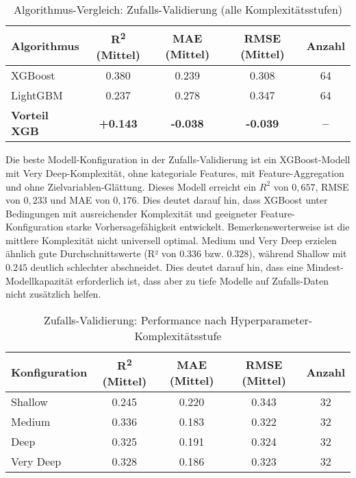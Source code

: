 \begin{table}[H]
  \centering
  \begin{tabular}{lcccc}
    \toprule
    \textbf{Algorithmus} & \textbf{R\textsuperscript{2} (Mittel)} & \textbf{MAE (Mittel)}  & \textbf{RMSE (Mittel)} & \textbf{Anzahl} \\
    \midrule
    XGBoost & 0.380 & 0.239 & 0.308 & 64 \\
    LightGBM & 0.237 & 0.278 & 0.347 & 64 \\
    \midrule
    \textbf{Vorteil XGB} & \textbf{+0.143} & \textbf{-0.038} & \textbf{-0.039} & \textbf{--} \\
    \bottomrule
  \end{tabular}
  \caption{Algorithmus-Vergleich: Zufalls-Validierung (alle Komplexitätsstufen)}
  \label{tab:algo_random}
\end{table}

Die beste Modell-Konfiguration in der Zufalls-Validierung ist ein XGBoost-Modell mit Very Deep-Komplexität, ohne kategoriale Features, mit Feature-Aggregation und ohne Zielvariablen-Glättung. Dieses Modell erreicht ein $R^2$ von $0{,}657$, RMSE von $0{,}233$ und MAE von $0{,}176$. Dies deutet darauf hin, dass XGBoost unter Bedingungen mit ausreichender Komplexität und geeigneter Feature-Konfiguration starke Vorhersagefähigkeit entwickelt. Bemerkenswerterweise ist die mittlere Komplexität nicht universell optimal. Medium und Very Deep erzielen ähnlich gute Durchschnittswerte (R² von $0.336$ bzw. $0.328$), während Shallow mit $0.245$ deutlich schlechter abschneidet. Dies deutet darauf hin, dass eine Mindest-Modellkapazität erforderlich ist, dass aber zu tiefe Modelle auf Zufalls-Daten nicht zusätzlich helfen.

\begin{table}[H]
  \centering
  \begin{tabular}{lcccc}
    \toprule
  	\textbf{Konfiguration} & \textbf{R\textsuperscript{2} (Mittel)} & \textbf{MAE (Mittel)}  & \textbf{RMSE (Mittel)} & \textbf{Anzahl} \\
    \midrule
    Shallow & 0.245 & 0.220 & 0.343 & 32 \\
    Medium & 0.336 & 0.183 & 0.322 & 32 \\
    Deep & 0.325 & 0.191 & 0.324 & 32 \\
    Very Deep & 0.328 & 0.186 & 0.323 & 32 \\
    \bottomrule
  \end{tabular}
  \caption{Zufalls-Validierung: Performance nach Hyperparameter-Komplexitätsstufe}
  \label{tab:complexity_random}
\end{table}

